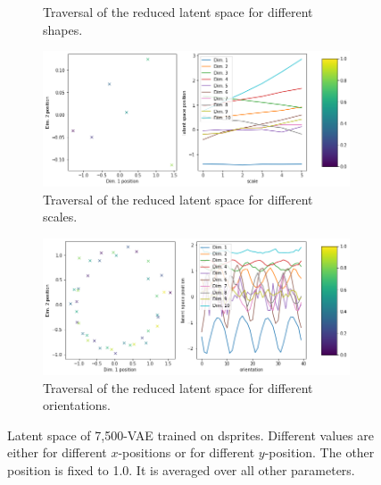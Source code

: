 \documentclass[11pt,a4paper]{article}
\begin{document}
\begin{figure}[H]
\begin{subfigure}{.48\textwidth}
\caption{Traversal of the reduced latent space for different shapes.}
\end{subfigure}
\begin{subfigure}{.48\textwidth}
\includegraphics[width=\textwidth]{images/latent_space_traversals/vae_7500_dsprites_latent_space_values_scale.png}
\caption{Traversal of the reduced latent space for different scales.}
\end{subfigure}
\begin{subfigure}{.48\textwidth}
\includegraphics[width=\textwidth]{images/latent_space_traversals/vae_7500_dsprites_latent_space_values_orientation.png}
\caption{Traversal of the reduced latent space for different orientations.}
\end{subfigure}
\caption[\ac{VAE} on dsprites: Latent Space Values]{Latent space of 7,500-\ac{VAE} trained on dsprites. Different values are either for different $x$-positions or for different $y$-position. The other position is fixed to 1.0. It is averaged over all other parameters.}
\label{fig:vae_dsprite_7500_latent_space_position}
\end{figure}
\end{document}
